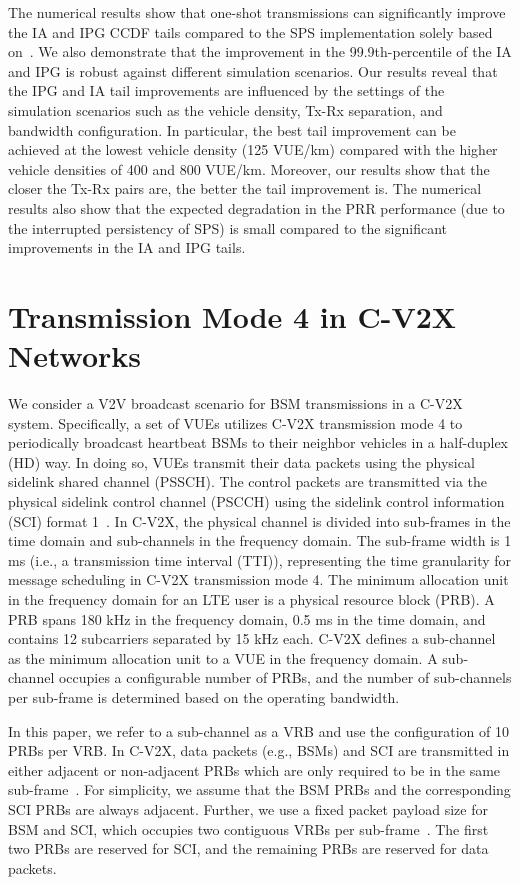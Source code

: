 \documentclass[conference]{IEEEtran}
\begin{document}
The numerical results show that one-shot transmissions can significantly improve the IA and IPG CCDF tails compared to the SPS implementation solely based on~\cite{3gpp36213}. We also demonstrate that the improvement in the 99.9th-percentile of the IA and IPG is robust against different simulation scenarios. Our results reveal that the IPG and IA tail improvements are influenced by the settings of the simulation scenarios such as the vehicle density, Tx-Rx separation, and bandwidth configuration. In particular, the best tail improvement can be achieved at the lowest vehicle density (125 VUE/km) compared with the higher vehicle densities of 400 and 800 VUE/km. Moreover, our results show that the closer the Tx-Rx pairs are, the better the tail improvement is. The numerical results also show that the expected degradation in the PRR performance (due to the interrupted persistency of SPS) is small compared to the significant improvements in the IA and IPG tails.

\section{Transmission Mode 4 in C-V2X Networks}\label{sec_tm4}

We consider a V2V broadcast scenario for BSM transmissions in a C-V2X system. Specifically, a set of VUEs utilizes C-V2X transmission mode 4 to periodically broadcast heartbeat BSMs to their neighbor vehicles in a half-duplex (HD) way. In doing so, VUEs transmit their data packets using the physical sidelink shared channel (PSSCH). The control packets are transmitted via the physical sidelink control channel (PSCCH) using the sidelink control information (SCI) format 1~\cite{3gpp36213}. In C-V2X, the physical channel is divided into sub-frames in the time domain and sub-channels in the frequency domain. The sub-frame width is 1 ms (i.e., a transmission time interval (TTI)), representing the time granularity for message scheduling in C-V2X transmission mode 4. The minimum allocation unit in the frequency domain for an LTE user is a physical resource block (PRB). A PRB spans 180 kHz in the frequency domain, 0.5 ms in the time domain, and contains 12 subcarriers separated by 15 kHz each. C-V2X defines a sub-channel as the minimum allocation unit to a VUE in the frequency domain. A sub-channel occupies a configurable number of PRBs, and the number of sub-channels per sub-frame is determined based on the operating bandwidth. 

In this paper, we refer to a sub-channel as a VRB and use the configuration of 10 PRBs per VRB. In C-V2X, data packets (e.g., BSMs) and SCI are transmitted in either adjacent or non-adjacent PRBs which are only required to be in the same sub-frame~\cite{3gpp36213}. For simplicity, we assume that the BSM PRBs and the corresponding SCI PRBs are always adjacent. Further, we use a fixed packet payload size for BSM and SCI, which occupies two contiguous VRBs per sub-frame~\cite{J3161}. The first two PRBs are reserved for SCI, and the remaining PRBs are reserved for data packets.
\end{document}
